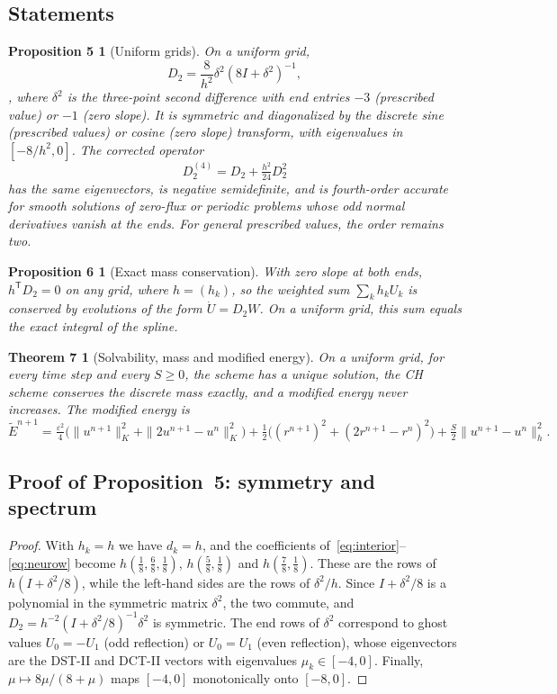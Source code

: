 \documentclass[11pt]{article}
\newtheorem*{proposition5}{Proposition 5}\newtheorem*{proposition6}{Proposition 6}\newtheorem*{theorem7}{Theorem 7}
\begin{document}
\subsection*{Statements}
\begin{proposition5}[Uniform grids]
On a uniform grid, \begin{equation}\label{eq:D2}D_2=\frac{8}{h^2}\delta^2(8I+\delta^2)^{-1},\end{equation}, where $\delta^2$ is the three-point second
difference with end entries $-3$ (prescribed value) or $-1$ (zero slope). It is symmetric and diagonalized
by the discrete sine (prescribed values) or cosine (zero slope) transform, with eigenvalues in
$[-8/h^2,0]$. The corrected operator
\begin{equation}\label{eq:D24}
D_2^{(4)}=D_2+\tfrac{h^2}{24}D_2^2
\end{equation}
has the same eigenvectors, is negative semidefinite, and is fourth-order accurate for smooth solutions
of zero-flux or periodic problems whose odd normal derivatives vanish at the ends. For general prescribed
values, the order remains two.
\end{proposition5}

\begin{proposition6}[Exact mass conservation]
With zero slope at both ends, $h^{\mathsf T}D_2=0$ on any grid, where $h=(h_k)$, so the weighted sum
$\sum_kh_kU_k$ is conserved by evolutions of the form $\dot U=D_2W$. On a uniform grid, this sum equals the
exact integral of the spline.
\end{proposition6}

\begin{theorem7}[Solvability, mass and modified energy]
On a uniform grid, for every time step and every $S\ge0$, the scheme has a unique solution, the CH scheme
conserves the discrete mass exactly, and a modified energy never increases.
The modified energy is
\[
\tilde E^{n+1}=\tfrac{\varepsilon^2}{4}\big(\|u^{n+1}\|_K^2+\|2u^{n+1}-u^n\|_K^2\big)
+\tfrac12\big((r^{n+1})^2+(2r^{n+1}-r^n)^2\big)+\tfrac S2\|u^{n+1}-u^n\|_h^2 .
\]
\end{theorem7}

\subsection*{Proof of Proposition~5: symmetry and spectrum}
\begin{proof}
With $h_k=h$ we have $d_k=h$, and the coefficients of~\eqref{eq:interior}--\eqref{eq:neurow} become
$h(\frac18,\frac68,\frac18)$, $h(\frac58,\frac18)$ and $h(\frac78,\frac18)$. These are the rows of
$h(I+\delta^2/8)$, while the left-hand sides are the rows of $\delta^2/h$. Since $I+\delta^2/8$ is a
polynomial in the symmetric matrix $\delta^2$, the two commute, and $D_2=h^{-2}(I+\delta^2/8)^{-1}\delta^2$ is
symmetric. The end rows of $\delta^2$ correspond to ghost values $U_0=-U_1$ (odd reflection) or $U_0=U_1$
(even reflection), whose eigenvectors are the DST-II and DCT-II vectors with eigenvalues $\mu_k\in[-4,0]$.
Finally, $\mu\mapsto8\mu/(8+\mu)$ maps $[-4,0]$ monotonically onto $[-8,0]$.
\end{proof}
\end{document}
